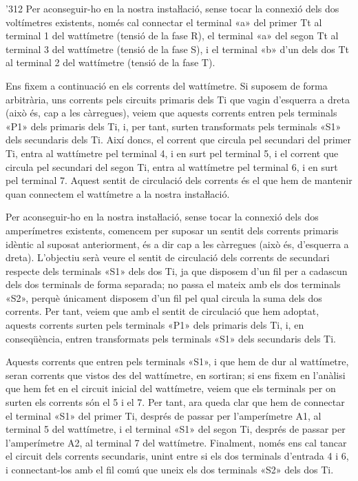 \begin{exemple}[\ConnexWatt{}]
\begin{dingautolist}{'312}
    Per aconseguir-ho en la nostra instaŀlació, sense tocar la
    connexió dels dos voltímetres existents, només cal connectar
    el terminal «\textsf{a}» del primer Tt al terminal 1 del wattímetre (tensió de
    la fase R), el terminal «\textsf{a}» del segon Tt al terminal 3 del wattímetre
    (tensió de la fase S), i el terminal «\textsf{b}» d'un dels dos Tt
    al terminal 2 del wattímetre (tensió de la fase T).

    \item Ens fixem a continuació en els corrents del wattímetre. Si suposem
    de forma arbitrària, uns corrents pels circuits primaris dels Ti
    que vagin d'esquerra a dreta (això és, cap a les càrregues), veiem
    que aquests corrents entren pels terminals «\textsf{P1}» dels primaris dels Ti,
    i, per tant, surten transformats pels terminals «\textsf{S1}» dels secundaris
    dels Ti. Així doncs, el corrent que circula pel secundari del primer
    Ti, entra al wattímetre pel terminal 4, i en surt pel terminal 5, i
    el corrent que circula pel secundari del segon Ti, entra al
    wattímetre pel terminal 6, i en surt pel terminal 7. Aquest sentit
    de circulació dels corrents és el que hem de mantenir quan
    connectem el wattímetre a la nostra instaŀlació.

    Per aconseguir-ho en la nostra instaŀlació, sense tocar la
    connexió dels dos amperímetres existents, comencem per suposar un
    sentit dels corrents primaris idèntic al suposat anteriorment, és a
    dir cap a les càrregues (això és, d'esquerra a dreta). L'objectiu
    serà veure el sentit de circulació dels corrents de secundari
    respecte dels terminals «\textsf{S1}» dels dos Ti, ja que disposem d'un fil per
    a cadascun dels dos terminals de forma separada; no passa el mateix
    amb els dos terminals «\textsf{S2}», perquè únicament disposem d'un fil pel
    qual circula la suma dels dos corrents. Per tant, veiem que amb el
    sentit de circulació que hem adoptat, aquests corrents surten pels
    terminals «\textsf{P1}» dels primaris dels Ti, i, en conseqüència, entren transformats
    pels terminals «\textsf{S1}» dels secundaris dels Ti.

    Aquests corrents que entren pels terminals «\textsf{S1}», i que hem de dur al
    wattímetre, seran corrents que vistos des del wattímetre, en
    sortiran; si ens fixem en l'anàlisi que hem fet en el
    circuit inicial del wattímetre, veiem que els terminals per on surten
    els corrents són el 5 i el 7. Per tant, ara queda clar que hem de
    connectar el terminal «\textsf{S1}» del primer Ti, després de passar per
    l'amperímetre \textsf{A1}, al terminal 5 del wattímetre, i el
    terminal «\textsf{S1}» del segon Ti, després de passar per l'amperímetre
    \textsf{A2}, al terminal 7 del wattímetre. Finalment, només ens cal
    tancar el circuit dels corrents secundaris, unint entre si els dos
    terminals d'entrada 4  i 6, i connectant-los amb el fil comú que
    uneix els dos terminals «\textsf{S2}» dels dos Ti.


\end{dingautolist}
\end{exemple}
